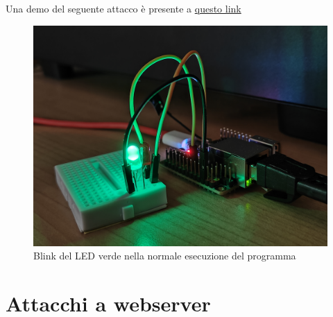Una demo del seguente attacco è presente a \href{https://github.com/BlessedRebuS/RISCV-Attacks/raw/main/img/blink-bof-demo.mov}{questo link}
\FloatBarrier
\vspace{1cm}
\begin{figure}[!htbp]
    \centering
    \includegraphics[width=0.65\linewidth]{images/blink.jpg}
    \caption{Blink del LED verde nella normale esecuzione del programma}
\end{figure}
\vspace{1cm}
\FloatBarrier
\section*{Attacchi a webserver}
